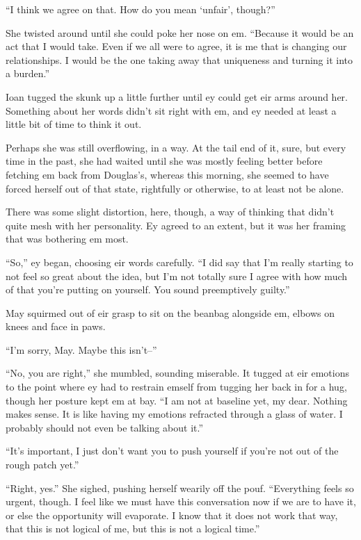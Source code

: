 ``I think we agree on that. How do you mean `unfair', though?''

She twisted around until she could poke her nose on em. ``Because it would be an act that I would take. Even if we all were to agree, it is me that is changing our relationships. I would be the one taking away that uniqueness and turning it into a burden.''

Ioan tugged the skunk up a little further until ey could get eir arms around her. Something about her words didn't sit right with em, and ey needed at least a little bit of time to think it out.

Perhaps she was still overflowing, in a way. At the tail end of it, sure, but every time in the past, she had waited until she was mostly feeling better before fetching em back from Douglas's, whereas this morning, she seemed to have forced herself out of that state, rightfully or otherwise, to at least not be alone.

There was some slight distortion, here, though, a way of thinking that didn't quite mesh with her personality. Ey agreed to an extent, but it was her framing that was bothering em most.

``So,'' ey began, choosing eir words carefully. ``I did say that I'm really starting to not feel so great about the idea, but I'm not totally sure I agree with how much of that you're putting on yourself. You sound preemptively guilty.''

May squirmed out of eir grasp to sit on the beanbag alongside em, elbows on knees and face in paws.

``I'm sorry, May. Maybe this isn't--''

``No, you are right,'' she mumbled, sounding miserable. It tugged at eir emotions to the point where ey had to restrain emself from tugging her back in for a hug, though her posture kept em at bay. ``I am not at baseline yet, my dear. Nothing makes sense. It is like having my emotions refracted through a glass of water. I probably should not even be talking about it.''

``It's important, I just don't want you to push yourself if you're not out of the rough patch yet.''

``Right, yes.'' She sighed, pushing herself wearily off the pouf. ``Everything feels so urgent, though. I feel like we must have this conversation now if we are to have it, or else the opportunity will evaporate. I know that it does not work that way, that this is not logical of me, but this is not a logical time.''

